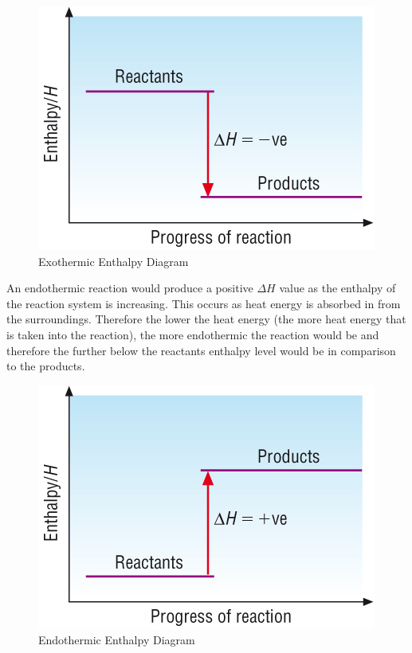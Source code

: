 \begin{figure}[H]
    \includegraphics[width=\textwidth]{./Planning/Images/Exothermic.jpg}
    \caption{Exothermic Enthalpy Diagram} \label{fig:Exothermic}
\end{figure}

An endothermic reaction would produce a positive $\Delta H$ value as the enthalpy of the reaction system is increasing. This occurs as heat energy is absorbed in from the surroundings. Therefore the lower the heat energy (the more heat energy that is taken into the reaction), the more endothermic the reaction would be and therefore the further below the reactants enthalpy level would be in comparison to the products.

\begin{figure}[H]
    \includegraphics[width=\textwidth]{./Planning/Images/Endothermic.jpg}
    \caption{Endothermic Enthalpy Diagram} \label{fig:Endothermic}
\end{figure}


